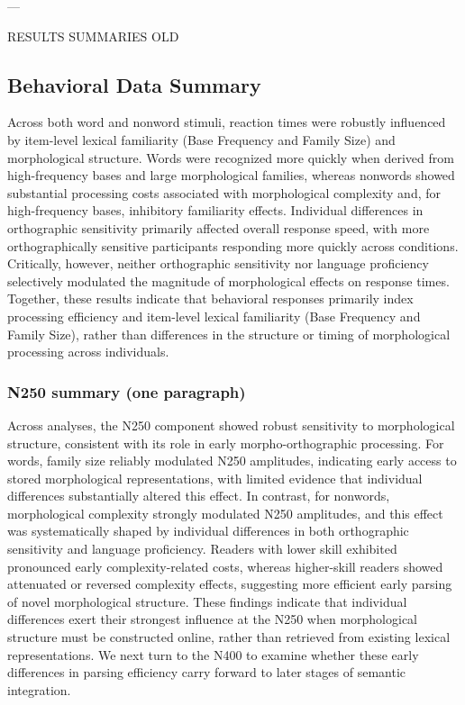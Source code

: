 ---

RESULTS SUMMARIES OLD

\subsection{Behavioral Data Summary}
Across both word and nonword stimuli, reaction times were robustly influenced by item-level lexical familiarity (Base Frequency and Family Size) and morphological structure. Words were recognized more quickly when derived from high-frequency bases and large morphological families, whereas nonwords showed substantial processing costs associated with morphological complexity and, for high-frequency bases, inhibitory familiarity effects. Individual differences in orthographic sensitivity primarily affected overall response speed, with more orthographically sensitive participants responding more quickly across conditions. Critically, however, neither orthographic sensitivity nor language proficiency selectively modulated the magnitude of morphological effects on response times. Together, these results indicate that behavioral responses primarily index processing efficiency and item-level lexical familiarity (Base Frequency and Family Size), rather than differences in the structure or timing of morphological processing across individuals.

\subsubsection{N250 summary (one paragraph)}
Across analyses, the N250 component showed robust sensitivity to morphological structure, consistent with its role in early morpho-orthographic processing. For words, family size reliably modulated N250 amplitudes, indicating early access to stored morphological representations, with limited evidence that individual differences substantially altered this effect. In contrast, for nonwords, morphological complexity strongly modulated N250 amplitudes, and this effect was systematically shaped by individual differences in both orthographic sensitivity and language proficiency. Readers with lower skill exhibited pronounced early complexity-related costs, whereas higher-skill readers showed attenuated or reversed complexity effects, suggesting more efficient early parsing of novel morphological structure. These findings indicate that individual differences exert their strongest influence at the N250 when morphological structure must be constructed online, rather than retrieved from existing lexical representations. We next turn to the N400 to examine whether these early differences in parsing efficiency carry forward to later stages of semantic integration.



